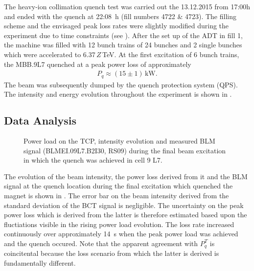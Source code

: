 The heavy-ion collimation quench test was carried out the 13.12.2015 from 17:00h and ended with the quench at 22:08~h (fill numbers 4722 \& 4723). The filling scheme and the envisaged peak loss rates were slightly modified during the experiment due to time constraints (see ). After the set up of the ADT in fill 1, the machine was filled with 12 bunch trains of 24 bunches and 2 single bunches which were accelerated to 6.37\,$Z$\,TeV. At the first excitation of 6 bunch trains, the MBB.9L7 quenched at a peak power loss of approximately 
%
\begin{align}
P_q \approx (15 \pm 1) \, \text{kW}.
\end{align} 
The beam was subsequently dumped by the quench protection system (QPS). The intensity and energy evolution throughout the experiment is shown in . 





\subsection{Data Analysis}

\begin{figure}[htbp]
  \centering
  \caption{Power load on the TCP, intensity evolution and measured BLM signal (BLMEI.09L7.B2I30, RS09) during the final beam excitation in which the quench was achieved in cell 9 L7.}  
  \label{pic:16071101}
  \end{figure}

The evolution of the beam intensity, the power loss derived from it and the BLM signal at the quench location during the final excitation which quenched the magnet is shown in . The error bar on the beam intensity derived from the standard deviation of the BCT signal is negligible. The uncertainty on the peak power loss which is derived from the latter is therefore estimated based upon the fluctiations visible in the rising power load evolution. The loss rate increased continuously over approximately 14~s when the peak power load was achieved and the quench occured. Note that the apparent agreement with $P_q^T$ is coincitental because the loss scenario from which the latter is derived is fundamentally different. 

